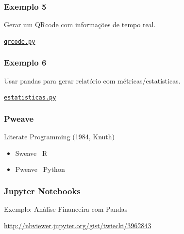 \documentclass{beamer}
\begin{document}
\begin{frame}
   \frametitle{Exemplo 5}
   Gerar um QRcode com informações de tempo real.
   \begin{center}
      \href{exemplos_codigo/qrcode/qrcode.py}{\tt{qrcode.py}}
   \end{center}
\end{frame}
\begin{frame}
   \frametitle{Exemplo 6}
   Usar pandas para gerar relatório com métricas/estatísticas.
   \begin{center}
      \href{exemplos_codigo/estatisticas/estatisticas.py}{\tt{estatisticas.py}}
   \end{center}
\end{frame}
\begin{frame}
   \frametitle{Pweave}

   \alert{Literate Programming} (1984, Knuth)
   
   \begin{itemize}
      \item Sweave \textemdash\ R
      \item Pweave \textemdash\ Python
   \end{itemize}
\end{frame}
\begin{frame}
   \frametitle{Jupyter Notebooks}
   \vfill
   Exemplo: Análise Financeira com Pandas

   \url{http://nbviewer.jupyter.org/gist/twiecki/3962843}
   \vfill
\end{frame}
\end{document}
